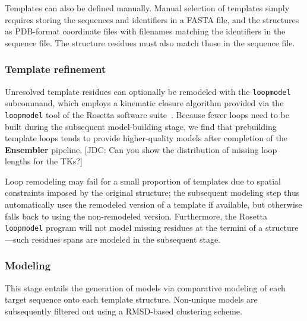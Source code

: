 \documentclass[aps,pre,twocolumn,nofootinbib,superscriptaddress,linenumbers]{revtex4-1}
\begin{document}
Templates can also be defined manually.
Manual selection of templates simply requires storing the sequences and identifiers in a FASTA file, and the structures as PDB-format coordinate files with filenames matching the identifiers in the sequence file.
The structure residues must also match those in the sequence file.

\subsubsection*{Template refinement}

Unresolved template residues can optionally be remodeled with the {\tt loopmodel} subcommand, which employs a kinematic closure algorithm provided via the {\tt loopmodel} tool of the Rosetta software suite~\cite{qian:nature:2007:modeller,wang:jmb:2007:modeller}.
Because fewer loops need to be built during the subsequent model-building stage, we find that prebuilding template loops tends to provide higher-quality models after completion of the {\bf Ensembler} pipeline.
{\color{red}[JDC: Can you show the distribution of missing loop lengths for the TKs?]}

Loop remodeling may fail for a small proportion of templates due to spatial constraints imposed by the original structure; the subsequent modeling step thus automatically uses the remodeled version of a template if available, but otherwise falls back to using the non-remodeled version.
Furthermore, the Rosetta {\tt loopmodel} program will not model missing residues at the termini of a structure---such residues spans are modeled in the subsequent stage.

\subsubsection*{Modeling}

This stage entails the generation of models via comparative modeling of each target sequence onto each template structure. Non-unique models are subsequently filtered out using a RMSD-based clustering scheme.
\end{document}
